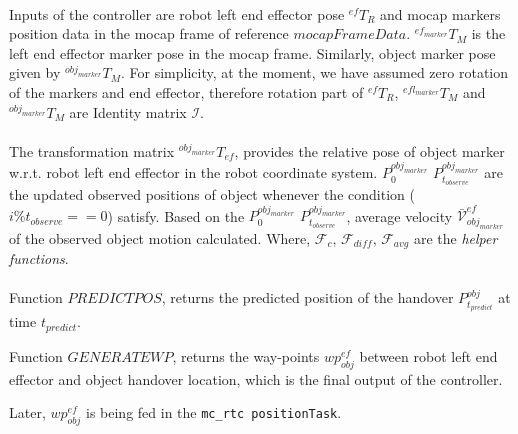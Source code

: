 \documentclass{article}
\begin{document}
\paragraph*{}
Inputs of the controller are robot left end effector pose $\mathcal{}^{ef}{T}_R$ and mocap markers position data in the mocap frame of reference $mocapFrameData$. $\mathcal{}^{ef_{marker}}{T}_M$ is the left end effector marker pose in the mocap frame. Similarly, object marker pose given by $\mathcal{}^{obj_{marker}}{T}_M$. For simplicity, at the moment, we have assumed zero rotation of the markers and end effector, therefore rotation part of $\mathcal{}^{ef}{T}_R$, $\mathcal{}^{efl_{marker}}{T}_M$ and $\mathcal{}^{obj_{marker}}{T}_M$ are Identity matrix $\mathcal{I}$. 

\paragraph*{}
The transformation matrix $\mathcal{}^{obj_{marker}}{T}_{ef}$, provides the relative pose of object marker w.r.t. robot left end effector in the robot coordinate system. $P^{obj_{marker}}_0$ $P^{obj_{marker}}_{t_{observe}}$ are the updated observed positions of object whenever the condition ($i\%t_{observe}==0$) satisfy. Based on the  $P^{obj_{marker}}_0$ $P^{obj_{marker}}_{t_{observe}}$, average velocity $\mathcal{\bar{V}}^{ef}_{obj_{marker}}$ of the observed object motion calculated. Where, $\mathcal{F}_c$, $\mathcal{F}_{diff}$, $\mathcal{F}_{avg}$ are the \textit{helper functions}.

\paragraph*{}
Function $PREDICTPOS$, returns the predicted position of the handover $P^{obj}_{t_{predict}}$ at time $t_{predict}$.

Function $GENERATEWP$, returns the way-points $wp^{ef}_{obj}$ between robot left end effector and object handover location, which is the final output of the controller. 

Later, $wp^{ef}_{obj}$ is being fed in the \texttt{mc\_rtc positionTask}.
\end{document}
